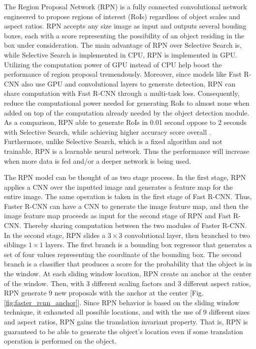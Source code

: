 The Region Proposal Network (RPN) is a fully connected convolutional network engineered to propose regions of interest (RoIs) regardless of object scales and aspect ratios. RPN accepts any size image as input and outputs several bouding boxes, each with a score representing the possibility of an object residing in the box under consideration. The main advantage of RPN over Selective Search is, while Selective Search is implemented in CPU, RPN is implemented in GPU. Utilizing the computation power of GPU instead of CPU help boost the performance of region proposal tremendously. Moreover, since models like Fast R-CNN also use GPU and convolutional layers to generate detection, RPN can share computation with Fast R-CNN through a multi-task loss. Consequently, reduce the computational power needed for generating RoIs to almost none when added on top of the computation already needed by the object detection module. As a comparison, RPN able to generate RoIs in 0.01 second oppose to 2 seconds with Selective Search, while achieving higher accuracy score overall \cite{faster_rcnn_2015}. Furthermore, unlike Selective Search, which is a fixed algorithm and not trainable, RPN is a learnable neural network. Thus the performance will increase when more data is fed and/or a deeper network is being used. 

The RPN model can be thought of as two stage process. In the first stage, RPN applies a CNN over the inputted image and generates a feature map for the entire image. The same operation is taken in the first stage of Fast R-CNN. Thus, Faster R-CNN can have a CNN to generate the image feature map, and then the image feature map proceeds as input for the second stage of RPN and Fast R-CNN. Thereby sharing computation between the two modules of Faster R-CNN. In the second stage, RPN slides a $3 \times 3$ convolutional layer, then branched to two siblings $1 \times 1$ layers. The first branch is a bounding box regressor that generates a set of four values representing the coordinate of the bounding box. The second branch is a classifier that produces a score for the probability that the object is in the window. At each sliding window location, RPN create an anchor at the center of the window. Then, with 3 different scaling factors and 3 different aspect ratios, RPN generate 9 new proposals with the anchor at the center [Fig. \ref{fig:faster_rcnn_anchor}]. Since RPN behavior is based on the sliding window technique, it exhausted all possible locations, and with the use of 9 different sizes and aspect ratios, RPN gains the translation invariant property. That is, RPN is guaranteed to be able to generate the object's location even if some translation operation is performed on the object.

